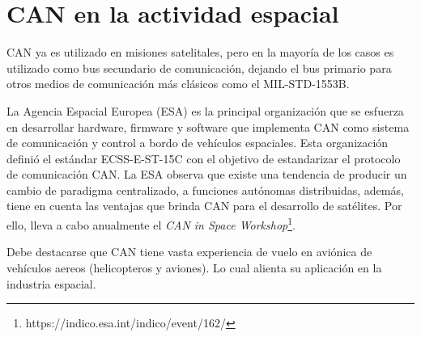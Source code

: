 \section{CAN en la actividad espacial}
CAN ya es utilizado en misiones satelitales, pero en la mayoría de los
casos es utilizado como bus secundario de comunicación, dejando el bus
primario para otros medios de comunicación más clásicos como el
MIL-STD-1553B.

La Agencia Espacial Europea (ESA) es la principal organización que se
esfuerza en desarrollar hardware, firmware y software que implementa
CAN como sistema de comunicación y control a bordo de vehículos espaciales.
Esta organización definió el estándar ECSS-E-ST-15C con el objetivo de
estandarizar el protocolo de comunicación CAN. La ESA observa que existe
una tendencia de producir un cambio de  paradigma 
centralizado, a funciones autónomas distribuidas, además, tiene en cuenta las ventajas que
brinda CAN para el desarrollo de satélites. Por ello, lleva a cabo anualmente
el \textit{CAN in Space Workshop}\footnote{https://indico.esa.int/indico/event/162/}.

Debe destacarse que CAN tiene vasta experiencia de vuelo en aviónica de
vehículos aereos (helicopteros y aviones). Lo cual alienta su aplicación
en la industria espacial.
